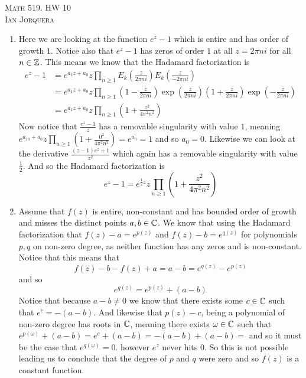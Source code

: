\documentclass[12pt]{amsart}
\begin{document}
\begin{center}
    \textsc{Math 519. HW 10\\ Ian Jorquera}
\end{center}
\vspace{1em}


\begin{enumerate}
\item Here we are looking at the function $e^z-1$ which is entire and has order of growth $1$. Notice also that $e^z-1$ has zeros of order $1$ at all $z=2\pi n i$ for all $n\in\mathbb{Z}$. This means we know that the Hadamard factorization is 
\begin{align*}
    e^z-1&=e^{a_1z+a_0}z\prod_{n\geq 1}E_k\left(\frac{z}{2\pi n i}\right)E_k\left(\frac{z}{-2\pi n i}\right)\\ &=e^{a_1z+a_0}z\prod_{n\geq 1}\left(1-\frac{z}{2\pi n i}\right)\exp\left(\frac{z}{2\pi n i}\right)\left(1+\frac{z}{2\pi n i}\right)\exp\left(-\frac{z}{2\pi n i}\right)\\
    &=e^{a_1z+a_0}z\prod_{n\geq 1}\left(1+\frac{z^2}{4\pi^2 n^2}\right)
\end{align*}
Now notice that $\frac{e^z-1}{z}$ has a removable singularity with value $1$, meaning $e^{a_10+a_0}z\prod_{n\geq 1}\left(1+\frac{0^2}{4\pi^2 n^2}\right)=e^{a_0}=1$ and so $a_0=0$. Likewise we can look at the derivative $\frac{(z-1)e^z+1}{z^2}$ which again has a removable singularity with value $\frac{1}{2}$. And so the Hadamard factorization is
$$e^z-1=e^{\frac{1}{2}z}z\prod_{n\geq 1}\left(1+\frac{z^2}{4\pi^2 n^2}\right)$$

\item 
Assume that $f(z)$ is entire, non-constant and has bounded order of growth and misses the distinct points $a,b\in\mathbb{C}$. We know that using the Hadamard factorization that $f(z)-a=e^{p(z)}$ and $f(z)-b=e^{q(z)}$ for polynomials $p,q$ on non-zero degree, as neither function has any zeros and is non-constant. Notice that this means that 
$$f(z)-b-f(z)+a=a-b=e^{q(z)}-e^{p(z)}$$
and so 
$$e^{q(z)}=e^{p(z)}+(a-b)$$
Notice that because $a-b\neq 0$ we know that there exists some $c\in\mathbb{C}$ such that $e^c=-(a-b)$. And likewise that $p(z)-c$, being a polynomial of non-zero degree has roots in $\mathbb{C}$, meaning there exists $\omega\in\mathbb{C}$ such that $e^{p(\omega)}+(a-b)=e^c+(a-b)=-(a-b)+(a-b)=$ and so it must be the case that $e^{q(\omega)}=0$. however $e^z$ never hits $0$. So this is not possible leading us to conclude that the degree of $p$ and $q$ were zero and so $f(z)$ is a constant function.\\



\end{enumerate}
\end{document}
